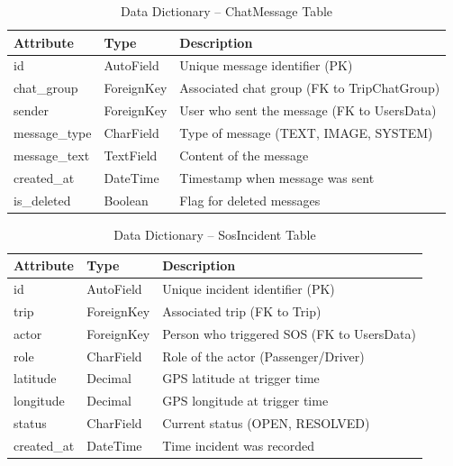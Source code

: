 \begin{table}[H]
\centering
\caption{Data Dictionary – ChatMessage Table}
\renewcommand{\arraystretch}{1.5}
\begin{tabular}{|p{3cm}|p{3cm}|p{7cm}|}
\hline
\textbf{Attribute} & \textbf{Type} & \textbf{Description} \\
\hline
id & AutoField & Unique message identifier (PK) \\
\hline
chat\_group & ForeignKey & Associated chat group (FK to TripChatGroup) \\
\hline
sender & ForeignKey & User who sent the message (FK to UsersData) \\
\hline
message\_type & CharField & Type of message (TEXT, IMAGE, SYSTEM) \\
\hline
message\_text & TextField & Content of the message \\
\hline
created\_at & DateTime & Timestamp when message was sent \\
\hline
is\_deleted & Boolean & Flag for deleted messages \\
\hline
\end{tabular}
\end{table}

\begin{table}[H]
\centering
\caption{Data Dictionary – SosIncident Table}
\renewcommand{\arraystretch}{1.5}
\begin{tabular}{|p{3cm}|p{3cm}|p{7cm}|}
\hline
\textbf{Attribute} & \textbf{Type} & \textbf{Description} \\
\hline
id & AutoField & Unique incident identifier (PK) \\
\hline
trip & ForeignKey & Associated trip (FK to Trip) \\
\hline
actor & ForeignKey & Person who triggered SOS (FK to UsersData) \\
\hline
role & CharField & Role of the actor (Passenger/Driver) \\
\hline
latitude & Decimal & GPS latitude at trigger time \\
\hline
longitude & Decimal & GPS longitude at trigger time \\
\hline
status & CharField & Current status (OPEN, RESOLVED) \\
\hline
created\_at & DateTime & Time incident was recorded \\
\hline
\end{tabular}
\end{table}

